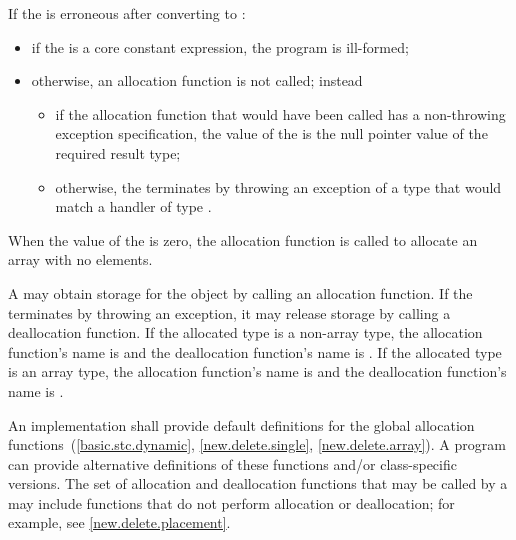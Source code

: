 If the  is erroneous after converting to :
\begin{itemize}
\item
if the  is a core constant expression,
the program is ill-formed;
\item
otherwise, an allocation function is not called; instead
\begin{itemize}
\item
if the allocation function that would have been called
has a non-throwing exception specification,
the value of the 
is the null pointer value of the required result type;
\item
otherwise, the  terminates by throwing an
exception of a type that would match a handler of type
.
\end{itemize}
\end{itemize}
When the value of the  is zero, the allocation
function is called to allocate an array with no elements.

\pnum
A  may obtain storage for the object by calling an
allocation function. If
the  terminates by throwing an exception, it
may release storage by calling a deallocation
function. If the allocated type
is a non-array type, the allocation function's name is
%
%
 and the deallocation function's name is
. If the allocated type is an array type, the
allocation function's name is
%
%
and the deallocation function's name is
.
\begin{note}
An implementation shall provide default definitions for the global
allocation
functions~(\ref{basic.stc.dynamic}, \ref{new.delete.single}, \ref{new.delete.array}).
A \Cpp{} program can provide alternative definitions of
these functions and/or class-specific
versions.
The set of allocation and deallocation functions that may be called
by a 
may include functions that do not perform allocation or deallocation;
for example, see \ref{new.delete.placement}.
\end{note}

